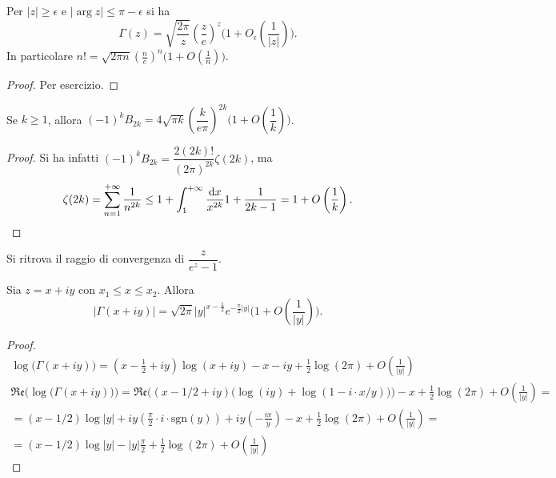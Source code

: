\begin{cor}
  Per $|z| \ge \epsilon$ e $|\arg{z}| \le \pi-\epsilon$ si ha
  $$\Gamma(z)=\sqrt{\frac{2\pi}{z}}\left(\frac{z}{e}\right)^z\Bigg(1+O_{\epsilon}\left(\frac{1}{|z|}\right)\Bigg).$$
  In particolare $\displaystyle n!=\sqrt{2\pi n}\left(\frac{n}{e}\right)^n\Bigg(1+O\left(\frac{1}{n}\right)\Bigg)$.
\end{cor}

\begin{proof}
  Per esercizio.
\end{proof}

\begin{cor}
  Se $k \ge 1$, allora $(-1)^kB_{2k}=4\sqrt{\pi k}\left(\dfrac{k}{e\pi}\right)^{2k}\Bigg(1+O\left(\dfrac{1}{k}\right)\Bigg)$.
\end{cor}

\begin{proof}
  Si ha infatti $(-1)^kB_{2k}=\dfrac{2(2k)!}{(2\pi)^{2k}}\zeta(2k)$, ma
  $$\zeta(2k)=\sum_{n=1}^{+\infty} \frac{1}{n^{2k}} \le 1+\int_1^{+\infty} \frac{\mathop{}\!\mathrm{d} x}{x^{2k}} 1+\frac{1}{2k-1}=1+O\left(\frac{1}{k}\right).$$
\end{proof}

\begin{oss}
  Si ritrova il raggio di convergenza di $\dfrac{z}{e^z-1}$.
\end{oss}

\begin{cor}
  Sia $z=x+iy$ con $x_1 \le x \le x_2$. Allora
  $$\left|\Gamma(x+iy)\right|=\sqrt{2\pi}|y|^{x-\frac{1}{2}}e^{-\frac{\pi}{2}|y|}\Bigg(1+O\left(\frac{1}{|y|}\right)\Bigg).$$
\end{cor}

\begin{proof}
  \begin{gather*}
    \log\big(\Gamma(x+iy)\big)=\left(x-\frac{1}{2}+iy\right)\log(x+iy)-x-iy+\frac{1}{2}\log(2\pi)+O\left(\frac{1}{|y|}\right) \\
    \mathfrak{Re}\Big(\log\big(\Gamma(x+iy)\big)\Big)=\mathfrak{Re}\Big((x-1/2+iy)\big(\log(iy)+\log(1-i\cdot x/y)\big)\Big)-x+\frac{1}{2}\log(2\pi)+O\left(\frac{1}{|y|}\right)= \\
    =(x-1/2)\log|y|+iy\left(\frac{\pi}{2}\cdot i\cdot\text{sgn}(y)\right)+iy\left(-\frac{ix}{y}\right)-x+\frac{1}{2}\log(2\pi)+O\left(\frac{1}{|y|}\right)=\\
    =(x-1/2)\log|y|-|y|\frac{\pi}{2}+\frac{1}{2}\log(2\pi)+O\left(\frac{1}{|y|}\right)
  \end{gather*}
\end{proof}
